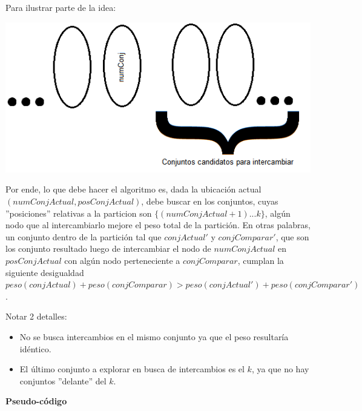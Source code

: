 Para ilustrar parte de la idea:

\includegraphics[scale=0.75]{ejercicio4/Vecindad1.png}

Por ende, lo que debe hacer el algoritmo es, dada la ubicación actual $(numConjActual, posConjActual)$, debe buscar en los conjuntos, cuyas ''posiciones'' relativas a la particion son $\{(numConjActual+1)...k\}$, algún nodo que al intercambiarlo mejore el peso total de la partición. En otras palabras, un conjunto dentro de la partición tal que $conjActual'$ y $conjComparar'$, que son los conjunto resultado luego de intercambiar el nodo de $numConjActual$ en $posConjActual$ con algún nodo perteneciente a $conjComparar$, cumplan la siguiente desigualdad $peso(conjActual) + peso(conjComparar) > peso(conjActual') + peso(conjComparar')$.

Notar 2 detalles:

\begin{itemize}
\item No se busca intercambios en el mismo conjunto ya que el peso resultaría idéntico.
\item El último conjunto a explorar en busca de intercambios es el $k$, ya que no hay conjuntos ''delante'' del $k$.
\end{itemize}

\hfill \newpage
\textbf{Pseudo-código}

